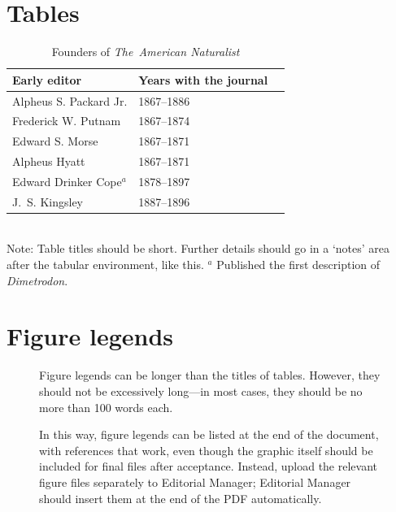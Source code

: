 \documentclass[11pt]{article}
\begin{document}
\newpage{}

\section*{Tables}
\renewcommand{\thetable}{\arabic{table}}
\setcounter{table}{0}

\begin{table}[h]
\caption{Founders of \textit{The~American Naturalist}}
\label{Table:Founders}
\centering
\begin{tabular}{lll}\hline
Early editor            & Years with the journal \\ \hline
Alpheus S. Packard Jr.  & 1867--1886 \\
Frederick W. Putnam     & 1867--1874 \\ 
Edward S. Morse         & 1867--1871 \\ 
Alpheus Hyatt           & 1867--1871 \\
Edward Drinker Cope$^a$ & 1878--1897 \\
J.~S. Kingsley          & 1887--1896 \\ \hline 
\end{tabular}
\bigskip{}
\\
{\footnotesize Note: Table titles should be short. Further details should go in a `notes' area after the tabular environment, like this. $^a$ Published the first description of \textit{Dimetrodon}.}
\end{table}

\newpage{}

\section*{Figure legends}

\begin{figure}[h!]
\caption{Figure legends can be longer than the titles of tables. However, they should not be excessively long---in most cases, they should be no more than 100 words each.}
\label{Fig:OkapiHorn}
\end{figure}



\begin{figure}[h!]
\caption{In this way, figure legends can be listed at the end of the document, with references that work, even though the graphic itself should be included for final files after acceptance. Instead, upload the relevant figure files separately to Editorial Manager; Editorial Manager should insert them at the end of the PDF automatically.}
\label{Fig:AnotherFigure}
\end{figure}
\end{document}

